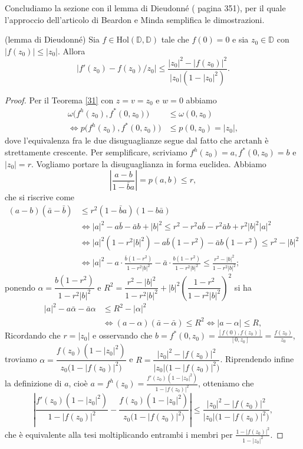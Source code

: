 Concludiamo la sezione con il lemma di Dieudonné (\cite{D} pagina 351), per il quale l'approccio dell'articolo di Beardon e Minda semplifica le dimostrazioni.

\begin{lm}
  (lemma di Dieudonné) Sia $f \in \text{Hol}(\mathbb{D},\mathbb{D})$ tale che $f(0)=0$ e sia $z_0 \in \mathbb{D}$ con $|f(z_0)| \le |z_0|$. Allora
  \begin{equation}
    |f'(z_0)-f(z_0)/z_0| \le \frac{|z_0|^2-|f(z_0)|^2}{|z_0|(1-|z_0|^2)}.
  \end{equation}
\end{lm}

\begin{proof}
  Per il Teorema \ref{31} con $z=v=z_0$ e $w=0$ abbiamo
  \begin{align*}
    \omega\bigl(f^h(z_0),f^*(0,z_0)\bigr) & \le \omega(0,z_0) \\
    \iff p\bigl(f^h(z_0),f^*(0,z_0)\bigr) & \le p(0,z_0)=|z_0|,
  \end{align*}
  dove l'equivalenza fra le due disuguaglianze segue dal fatto che $\text{arctanh}$ è strettamente crescente. Per semplificare, scriviamo $f^h(z_0)=a, f^*(0,z_0)=b$ e $|z_0|=r$. Vogliamo portare la disuguaglianza in forma euclidea. Abbiamo
  $$\left|\frac{a-b}{1-\bar{b}a}\right|=p(a,b) \le r,$$
  che si riscrive come
  \begin{align*}
    (a-b)(\bar{a}-\bar{b}) & \le r^2(1-\bar{b}a)(1-b\bar{a}) \\
    & \iff |a|^2-a\bar{b}-\bar{a}b+|b|^2 \le r^2-r^2a\bar{b}-r^2\bar{a}b+r^2|b|^2|a|^2 \\
    & \iff |a|^2(1-r^2|b|^2)-a\bar{b}(1-r^2)-\bar{a}b(1-r^2) \le r^2-|b|^2 \\
    & \iff |a|^2-a\cdot\frac{\bar{b}(1-r^2)}{1-r^2|b|^2}-\bar{a}\cdot\frac{b(1-r^2)}{1-r^2|b|^2} \le \frac{r^2-|b|^2}{1-r^2|b|^2};
  \end{align*}
  ponendo $\alpha=\dfrac{b(1-r^2)}{1-r^2|b|^2}$ e $R^2=\dfrac{r^2-|b|^2}{1-r^2|b|^2}+|b|^2\left(\dfrac{1-r^2}{1-r^2|b|^2}\right)^2$ si ha
  \begin{align*}
    |a|^2-a\bar{\alpha}-\bar{a}\alpha & \le R^2-|\alpha|^2 \\
    & \iff (a-\alpha)(\bar{a}-\bar{\alpha}) \le R^2\iff |a-\alpha| \le R,
  \end{align*}
  Ricordando che $r=|z_0|$ e osservando che $b=f^*(0,z_0)=\frac{[f(0),f(z_0)]}{[0,z_0]}=\frac{f(z_0)}{z_0}$, troviamo $\alpha=\dfrac{f(z_0)(1-|z_0|^2)}{z_0\bigl(1-|f(z_0)|^2\bigr)}$ e $R=\dfrac{|z_0|^2-|f(z_0)|^2}{|z_0|\bigl(1-|f(z_0)|^2\bigr)}$.
  Riprendendo infine la definizione di $a$, cioè $a=f^h(z_0)=\frac{f'(z_0)(1-|z_0|^2)}{1-|f(z_0)|^2}$, otteniamo che
  $$\left|\frac{f'(z_0)(1-|z_0|^2)}{1-|f(z_0)|^2}-\frac{f(z_0)(1-|z_0|^2)}{z_0\bigl(1-|f(z_0)|^2\bigr)}\right| \le \frac{|z_0|^2-|f(z_0)|^2}{|z_0|\bigl(1-|f(z_0)|^2\bigr)},$$
  che è equivalente alla tesi moltiplicando entrambi i membri per $\frac{1-|f(z_0)|^2}{1-|z_0|^2}$.
\end{proof}
